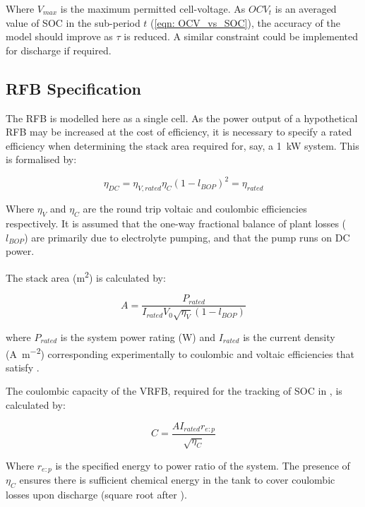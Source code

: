 \documentclass[preprint,3p,review,authoryear,10pt]{elsarticle}
\begin{document}
Where $V_{max}$ is the maximum permitted cell-voltage. As $OCV_t$ is an averaged value of SOC in the sub-period $t$ (\cref{eqn: OCV_vs_SOC}), the accuracy of the model should improve as $\tau$ is reduced. A similar constraint could be implemented for discharge if required.

\subsection{RFB Specification}
\label{VRFB_specification}
The RFB is modelled here as a single cell. As the power output of a hypothetical RFB may be increased at the cost of efficiency, it is necessary to specify a rated efficiency when determining the stack area required for, say, a \SI{1}{\kilo\watt} system. This is formalised by:

\begin{equation}
\label{eqn: Rated_efficiency}
\eta_{DC} = \eta_{V,rated}\eta_{C}(1-l_{BOP})^2 = \eta_{rated}
\end{equation}

Where $\eta_V$ and $\eta_C$ are the round trip voltaic and coulombic efficiencies respectively. It is assumed that the one-way fractional balance of plant losses ($l_{BOP}$) are primarily due to electrolyte pumping, and that the pump runs on DC power.

The stack area (\si{\square\meter}) is calculated by:

\begin{equation}
\label{eqn: Simple_RFB_Cost_Model_Stack_Area}
A = \frac{P_{rated}}{I_{rated}V_0\sqrt{\eta_V}(1 - l_{BOP})}
\end{equation}

where $P_{rated}$ is the system power rating (\si{\watt}) and $I_{rated}$ is the current density (\si{\ampere\per\square\metre}) corresponding experimentally to coulombic and voltaic efficiencies that satisfy .

The coulombic capacity of the VRFB, required for the tracking of SOC in , is calculated by:

\begin{equation}
\label{eqn: coulombic_capacity}
C = \frac{AI_{rated}r_{e:p}}{\sqrt{\eta_C}}
\end{equation}

Where $r_{e:p}$ is the specified energy to power ratio of the system. The presence of $\eta_C$ ensures there is sufficient chemical energy in the tank to cover coulombic losses upon discharge (square root after \cite{Darling2014}).
\end{document}
